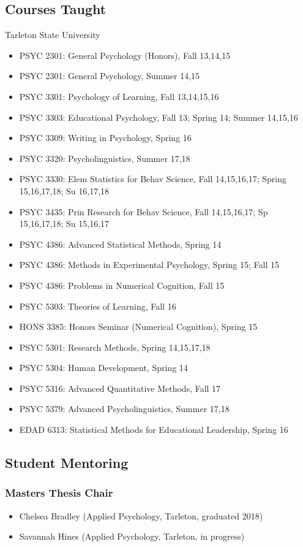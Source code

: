 \documentclass[article,10pt]{article}
\begin{document}
\subsection*{Courses Taught}
\label{sec:org38487c6}

Tarleton State University

\begin{itemize}
\item PSYC 2301: General Psychology (Honors), Fall 13,14,15
\item PSYC 2301: General Psychology, Summer 14,15
\item PSYC 3301: Psychology of Learning, Fall 13,14,15,16
\item PSYC 3303: Educational Psychology, Fall 13; Spring 14; Summer 14,15,16
\item PSYC 3309: Writing in Psychology, Spring 16
\item PSYC 3320: Psycholinguistics, Summer 17,18
\item PSYC 3330: Elem Statistics for Behav Science, Fall 14,15,16,17; Spring 15,16,17,18; Su 16,17,18
\item PSYC 3435: Prin Research for Behav Science, Fall 14,15,16,17; Sp 15,16,17,18; Su 15,16,17
\item PSYC 4386: Advanced Statistical Methods, Spring 14
\item PSYC 4386: Methods in Experimental Psychology, Spring 15; Fall 15
\item PSYC 4386: Problems in Numerical Cognition, Fall 15
\item PSYC 5303: Theories of Learning, Fall 16
\item HONS 3385: Honors Seminar (Numerical Cognition), Spring 15
\item PSYC 5301: Research Methods, Spring 14,15,17,18
\item PSYC 5304: Human Development, Spring 14
\item PSYC 5316: Advanced Quantitative Methods, Fall 17
\item PSYC 5379: Advanced Psycholinguistics, Summer 17,18
\item EDAD 6313: Statistical Methods for Educational Leadership, Spring 16
\end{itemize}

\subsection*{Student Mentoring}
\label{sec:orgf040aac}

\subsubsection*{Masters Thesis Chair}
\label{sec:org1508012}
\begin{itemize}
\item Chelsea Bradley (Applied Psychology, Tarleton, graduated 2018)
\item Savannah Hines (Applied Psychology, Tarleton, in progress)
\end{itemize}
\end{document}
